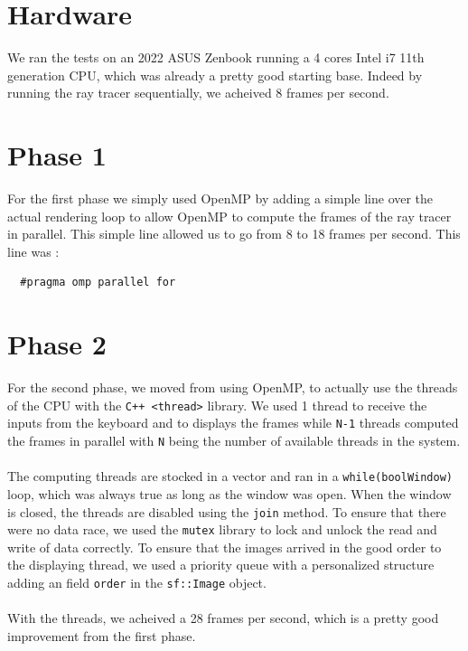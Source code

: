 \documentclass{article}
\begin{document}
\setcounter{page}{1}

\section{Hardware}
We ran the tests on an 2022 ASUS Zenbook running a 4 cores Intel i7 11th generation CPU, which was already a pretty good starting base. Indeed by 
running the ray tracer sequentially, we acheived 8 frames per second.

\section{Phase 1}
For the first phase we simply used OpenMP by adding a simple line over the actual rendering loop to allow OpenMP to compute the frames 
of the ray tracer in parallel. This simple line allowed us to go from 8 to 18 frames per second. This line was :
\begin{verbatim}
  #pragma omp parallel for
\end{verbatim}

\section{Phase 2}
For the second phase, we moved from using OpenMP, to actually use the threads of the CPU with the \verb|C++ <thread>| library. We used 1 thread to receive the 
inputs from the keyboard and to displays the frames while \verb|N-1| threads computed the frames in parallel with \verb|N| being the number of available threads in the system.
\paragraph{}
The computing threads are stocked in a vector and ran in a \verb|while(boolWindow)| loop, which was always true as long as the window was open. When the window is closed, the threads are disabled using the \verb|join| method. To 
ensure that there were no data race, we used the \verb|mutex| library to lock and unlock the read and write of data correctly. To ensure that the images arrived in the good order to the displaying thread, we used a priority queue with 
a personalized structure adding an field \verb|order| in the \verb|sf::Image| object.
\paragraph{}
With the threads, we acheived a 28 frames per second, which is a pretty good improvement from the first phase.
\end{document}
